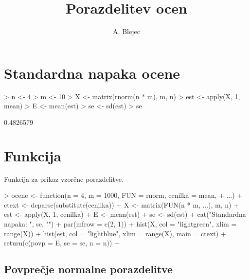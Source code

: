 \documentclass[a4paper,12pt]{article}
\begin{document}
\title{Porazdelitev ocen}
\author{A. Blejec}
%

\maketitle
\tableofcontents

\section{Standardna napaka ocene}

\begin{Schunk}
\begin{Sinput}
> n <- 4
> m <- 10
> X <- matrix(rnorm(n * m), m, n)
> est <- apply(X, 1, mean)
> E <- mean(est)
> se <- sd(est)
> se
\end{Sinput}
\begin{Soutput}
[1] 0.4826579
\end{Soutput}
\end{Schunk}

\section{Funkcija}
Funkcija za prikaz vzorčne porazdelitve.
\begin{Schunk}
\begin{Sinput}
> ocene <- function(n = 4, m = 1000, FUN = rnorm, cenilka = mean, 
+     ...) {
+     ctext <- deparse(substitute(cenilka))
+     X <- matrix(FUN(n * m, ...), m, n)
+     est <- apply(X, 1, cenilka)
+     E <- mean(est)
+     se <- sd(est)
+     cat("Standardna napaka: \n", se, "\n")
+     par(mfrow = c(2, 1))
+     hist(X, col = "lightgreen", xlim = range(X))
+     hist(est, col = "lightblue", xlim = range(X), main = ctext)
+     return(c(povp = E, se = se, n = n))
+ }
\end{Sinput}
\end{Schunk}
\clearpage
\subsection{Povprečje normalne porazdelitve}
\end{document}
